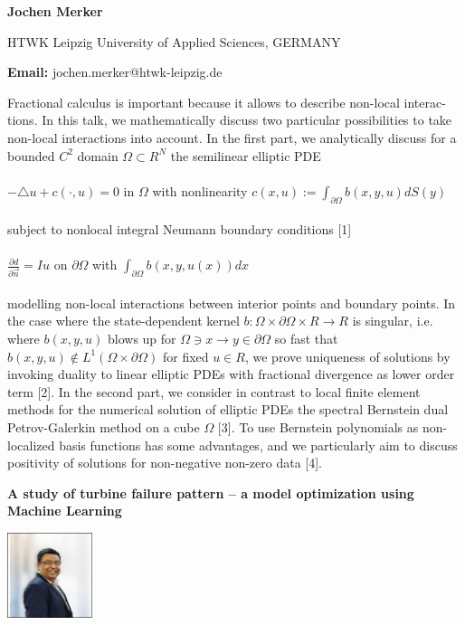 \documentclass[twoside,11pt]{amsart}
\begin{document}
\centerline{\textbf{  Jochen Merker}}
\vskip 2mm
\begin{flushleft}
HTWK Leipzig University of Applied Sciences, GERMANY
\end{flushleft}
\vskip 2mm
\begin{flushleft}
{\bf Email:} jochen.merker@htwk-leipzig.de
\end{flushleft}

\vskip 10mm
Fractional calculus is important because it allows to describe non-local interac-
tions. In this talk, we mathematically discuss two particular possibilities to take
non-local interactions into account. In the first part, we analytically discuss for a
bounded $C^{2}$ domain $\Omega \subset R^{N}$ the semilinear elliptic PDE\\\\
$-\triangle u + c(·, u) = 0$ in $\Omega $ with nonlinearity $c(x, u) := \int_{\partial \Omega}b(x, y, u) dS(y)$\\\\
subject to nonlocal integral Neumann boundary conditions [1]\\
\\
$\frac{\partial d}{\partial \vec{n}} = Iu$ on $\partial \Omega$ with $\int_{\partial \Omega}b(x, y, u(x)) dx$\\\\
modelling non-local interactions between interior points and boundary points. In the
case where the state-dependent kernel $b : \Omega  \times \partial \Omega\times  R \longrightarrow R $ is singular, i.e. where
$b(x, y, u)$ blows up for $\Omega \ni  x \rightarrow y \in \partial \Omega$ so fast that $b(x, y, u) \notin L^{1}(\Omega  \times \partial \Omega)$ for fixed $u \in R$, we prove uniqueness of solutions by invoking duality to linear elliptic PDEs
with fractional divergence as lower order term [2]. In the second part, we consider in
contrast to local finite element methods for the numerical solution of elliptic PDEs
the spectral Bernstein dual Petrov-Galerkin method on a cube $\Omega$ [3]. To use Bernstein
polynomials as non-localized basis functions has some advantages, and we particularly
aim to discuss positivity of solutions for non-negative non-zero data [4].
\vskip 5mm
\newpage


\vskip 10mm
\begin{center}\bf\LARGE
A study of turbine failure pattern – a model optimization using Machine Learning
\end{center}
\vskip 5mm
\begin{center}
\includegraphics[width=2.5cm, height=2.5cm, keepaspectratio=false]{BR.jpg}
\end{center}
\end{document}
